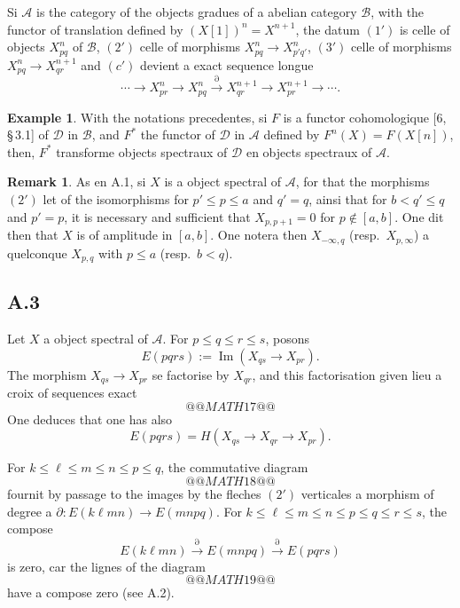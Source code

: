 \documentclass[11pt,a4paper]{article}
\theoremstyle{plain}
\theoremstyle{definition}
\newtheorem{example}[theorem]{Example}
\newtheorem{remark}[theorem]{Remark}
\newcommand{\cD}{\mathscr{D}}
\newcommand{\cA}{\mathscr{A}}
\newcommand{\cB}{\mathscr{B}}
\begin{document}
Si $\cA$ is the category of the objects gradues of a abelian category $\cB$, with the functor of translation defined by $(X[1])^n = X^{n+1}$, the datum $(1')$ is celle of objects $X_{pq}^n$ of $\cB$, $(2')$ celle of morphisms $X_{pq}^n \to X_{p'q'}^n$, $(3')$ celle of morphisms $X_{pq}^n \to X_{qr}^{n+1}$ and $(c')$ devient a exact sequence longue
\[
\cdots \to X_{pr}^n \to X_{pq}^n \xrightarrow{\partial} X_{qr}^{n+1} \to X_{pr}^{n+1} \to \cdots.
\]

\begin{example}
With the notations precedentes, si $F$ is a functor cohomologique [6, \S\,3.1] of $\cD$ in $\cB$, and $F^*$ the functor of $\cD$ in $\cA$ defined by $F^n(X) = F(X[n])$, then, $F^*$ transforme objects spectraux of $\cD$ en objects spectraux of $\cA$.
\end{example}

\begin{remark}
As en A.1, si $X$ is a object spectral of $\cA$, for that the morphisms $(2')$ let of the isomorphisms for $p' \leqslant p \leqslant a$ and $q'=q$, ainsi that for $b < q' \leqslant q$ and $p'=p$, it is necessary and sufficient that $X_{p,p+1} = 0$ for $p \notin [a,b]$. One dit then that $X$ is of amplitude in $[a,b]$. One notera then $X_{-\infty,q}$ (resp.~$X_{p,\infty}$) a quelconque $X_{p,q}$ with $p \leqslant a$ (resp.~$b < q$).
\end{remark}

\subsection*{A.3}
Let $X$ a object spectral of $\cA$. For $p \leqslant q \leqslant r \leqslant s$, posons
\begin{equation}\label{eq:A.3.1}
E(pqrs) := \operatorname{Im}(X_{qs} \to X_{pr}).
\end{equation}
The morphism $X_{qs} \to X_{pr}$ se factorise by $X_{qr}$, and this factorisation given lieu a croix of sequences exact
\[
@@MATH17@@
\]
One deduces that one has also
\begin{equation}\label{eq:A.3.2}
E(pqrs) = H(X_{qs} \to X_{qr} \to X_{pr}).
\end{equation}

For $k \leqslant \ell \leqslant m \leqslant n \leqslant p \leqslant q$, the commutative diagram
\[
@@MATH18@@
\]
fournit by passage to the images by the fleches $(2')$ verticales a morphism of degree a $\partial \colon E(k\ell mn) \to E(mnpq)$. For $k \leqslant \ell \leqslant m \leqslant n \leqslant p \leqslant q \leqslant r \leqslant s$, the compose
\begin{equation}\label{eq:A.3.3}
E(k\ell mn) \xrightarrow{\partial} E(mnpq) \xrightarrow{\partial} E(pqrs)
\end{equation}
is zero, car the lignes of the diagram
\[
@@MATH19@@
\]
have a compose zero (see A.2).
\end{document}

